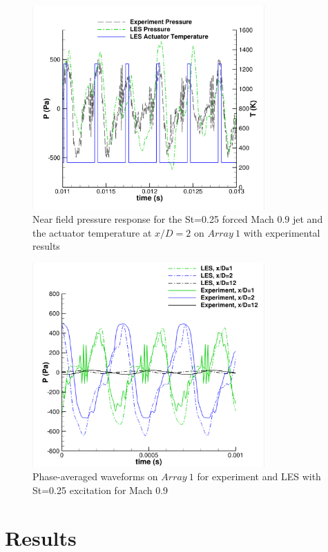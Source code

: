 \documentclass[english]{aiaa-tc}
\begin{document}
\begin{figure}
\begin{center}
	\includegraphics[width=3.5in]{M09pointwithactuatorx2array1ST025}%
	\caption{Near field pressure response for the St=0.25 forced Mach $0.9$ jet and the actuator temperature at $x/D=2$ on $Array~1$ with experimental results \cite{Crawley2014}}
	\label{fig:pointprobeM09}
\end{center}
\end{figure}
\begin{figure}
\begin{center}
	\includegraphics[width=3.5in]{M09LESandExpaxialphase}%
\caption{Phase-averaged waveforms on $Array~1$ for experiment \cite{Crawley2014} and LES with St=0.25 excitation for Mach 0.9}
\label{fig:phasex2all}
\end{center}
 \end{figure}

\section{Results}\label{results} 
\end{document}
